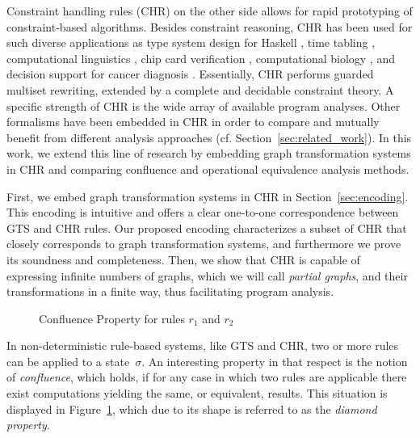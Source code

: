\documentclass{tlp}
\begin{document}
Constraint handling rules (CHR) \cite{fruehwirth09} on the other side allows for
rapid prototyping of constraint-based algorithms. Besides constraint reasoning,
CHR has been used for such diverse applications as type system design for Haskell
\cite{sulz_schr_stuck_aplas06}, time tabling
\cite{abd_marte_timetabling_chr_aai00}, computational linguistics
\cite{dahl_maharshak_dna_replication_iwinac09}, chip card verification
\cite{pretschner_et_al_model-based_testing_sttt04}, computational biology
\cite{bavarian_dahl_bio_seq_analysis_jucs06}, and decision support for cancer
diagnosis \cite{alma_thesis05}. Essentially, CHR performs guarded multiset
rewriting, extended by a complete and decidable constraint theory. A specific
strength of CHR is the wide array of available program analyses. Other formalisms
have been embedded in CHR in order to compare and mutually benefit from different
analysis approaches (cf. Section~\ref{sec:related_work}). In this work, we extend
this line of research by embedding graph transformation systems in CHR and
comparing confluence and operational equivalence analysis methods.

First, we embed graph transformation systems in CHR \cite{raiser07iclp} in
Section~\ref{sec:encoding}. This encoding is intuitive and offers a clear
one-to-one correspondence between GTS and CHR rules. Our proposed encoding
characterizes a subset of CHR that closely corresponds to graph transformation
systems, and furthermore we prove its soundness and completeness. Then, we show
that CHR is capable of expressing infinite numbers of graphs, which we will call
\emph{partial graphs}, and their transformations in a finite way, thus
facilitating program analysis.

\begin{figure} 
\centerline{
}
\caption{Confluence Property for rules $r_1$ and $r_2$}
\label{fig:confluence}
\end{figure}

In non-deterministic rule-based systems, like GTS and CHR, two or more rules can
be applied to a state~$\sigma$. An interesting property in that respect is the
notion of \emph{confluence}, which holds, if for any case in which two rules are
applicable there exist computations yielding the same, or equivalent, results.
This situation is displayed in Figure~\ref{fig:confluence}, which due to its
shape is referred to as the \emph{diamond property}.
\end{document}
